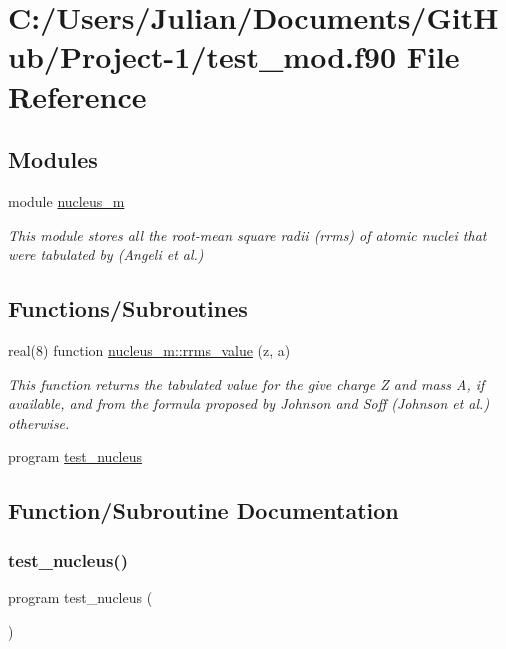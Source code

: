 \hypertarget{test__mod_8f90}{}\section{C\+:/\+Users/\+Julian/\+Documents/\+Git\+Hub/\+Project-\/1/test\+\_\+mod.f90 File Reference}
\label{test__mod_8f90}
\subsection*{Modules}
\begin{DoxyCompactItemize}
\item 
module \mbox{\hyperlink{namespacenucleus__m}{nucleus\+\_\+m}}
\begin{DoxyCompactList}\small\item\em This module stores all the root-\/mean square radii (rrms) of atomic nuclei that were tabulated by (Angeli et al.) \end{DoxyCompactList}\end{DoxyCompactItemize}
\subsection*{Functions/\+Subroutines}
\begin{DoxyCompactItemize}
\item 
real(8) function \mbox{\hyperlink{namespacenucleus__m_a83e8714be10756711874d134c66bcf73}{nucleus\+\_\+m\+::rrms\+\_\+value}} (z, a)
\begin{DoxyCompactList}\small\item\em This function returns the tabulated value for the give charge Z and mass A, if available, and from the formula proposed by Johnson and Soff (Johnson et al.) otherwise. \end{DoxyCompactList}\item 
program \mbox{\hyperlink{test__mod_8f90_a8ebb53a70bcfe3c94dbfbae3e3f52cba}{test\+\_\+nucleus}}
\end{DoxyCompactItemize}


\subsection{Function/\+Subroutine Documentation}
\mbox{\label{test__mod_8f90_a8ebb53a70bcfe3c94dbfbae3e3f52cba}} 
\subsubsection{\texorpdfstring{test\_nucleus()}{test\_nucleus()}}
{\footnotesize\ttfamily program test\+\_\+nucleus (\begin{DoxyParamCaption}{ }\end{DoxyParamCaption})}

